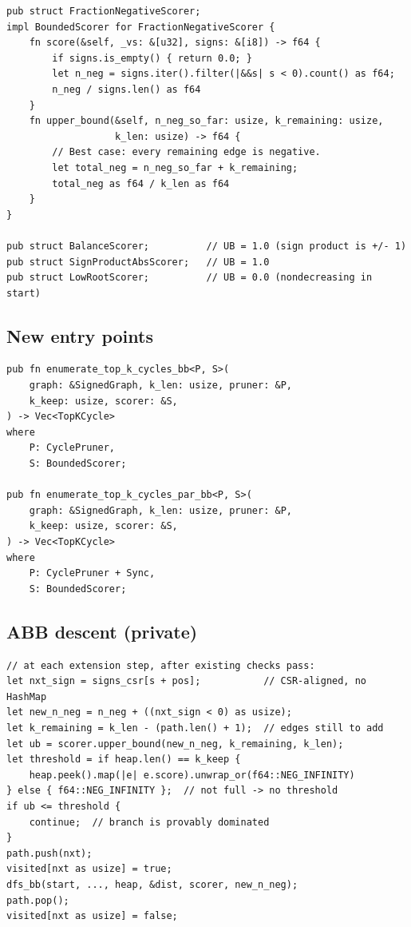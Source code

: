 \documentclass[a4paper,11pt]{article}
\begin{document}
\begin{lstlisting}
pub struct FractionNegativeScorer;
impl BoundedScorer for FractionNegativeScorer {
    fn score(&self, _vs: &[u32], signs: &[i8]) -> f64 {
        if signs.is_empty() { return 0.0; }
        let n_neg = signs.iter().filter(|&&s| s < 0).count() as f64;
        n_neg / signs.len() as f64
    }
    fn upper_bound(&self, n_neg_so_far: usize, k_remaining: usize,
                   k_len: usize) -> f64 {
        // Best case: every remaining edge is negative.
        let total_neg = n_neg_so_far + k_remaining;
        total_neg as f64 / k_len as f64
    }
}

pub struct BalanceScorer;          // UB = 1.0 (sign product is +/- 1)
pub struct SignProductAbsScorer;   // UB = 1.0
pub struct LowRootScorer;          // UB = 0.0 (nondecreasing in start)
\end{lstlisting}

\subsection*{New entry points}

\begin{lstlisting}
pub fn enumerate_top_k_cycles_bb<P, S>(
    graph: &SignedGraph, k_len: usize, pruner: &P,
    k_keep: usize, scorer: &S,
) -> Vec<TopKCycle>
where
    P: CyclePruner,
    S: BoundedScorer;

pub fn enumerate_top_k_cycles_par_bb<P, S>(
    graph: &SignedGraph, k_len: usize, pruner: &P,
    k_keep: usize, scorer: &S,
) -> Vec<TopKCycle>
where
    P: CyclePruner + Sync,
    S: BoundedScorer;
\end{lstlisting}

\subsection*{ABB descent (private)}

\begin{lstlisting}
// at each extension step, after existing checks pass:
let nxt_sign = signs_csr[s + pos];           // CSR-aligned, no HashMap
let new_n_neg = n_neg + ((nxt_sign < 0) as usize);
let k_remaining = k_len - (path.len() + 1);  // edges still to add
let ub = scorer.upper_bound(new_n_neg, k_remaining, k_len);
let threshold = if heap.len() == k_keep {
    heap.peek().map(|e| e.score).unwrap_or(f64::NEG_INFINITY)
} else { f64::NEG_INFINITY };  // not full -> no threshold
if ub <= threshold {
    continue;  // branch is provably dominated
}
path.push(nxt);
visited[nxt as usize] = true;
dfs_bb(start, ..., heap, &dist, scorer, new_n_neg);
path.pop();
visited[nxt as usize] = false;
\end{lstlisting}
\end{document}
